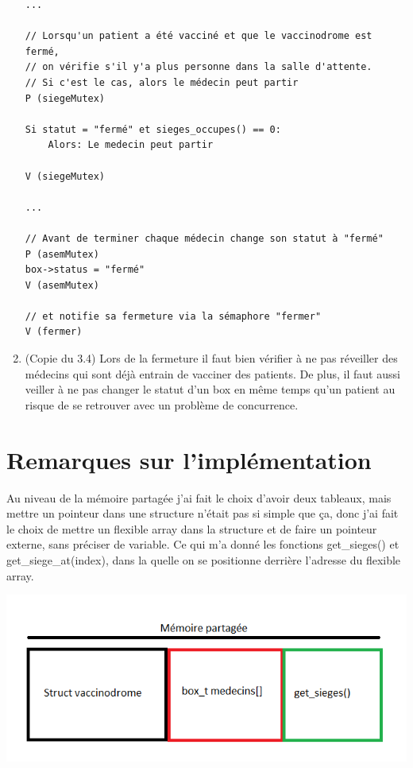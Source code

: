 \documentclass[a4paper]{article}
\begin{document}
\begin{enumerate}
\begin{verbatim}
...

// Lorsqu'un patient a été vacciné et que le vaccinodrome est fermé,
// on vérifie s'il y'a plus personne dans la salle d'attente.
// Si c'est le cas, alors le médecin peut partir
P (siegeMutex)

Si statut = "fermé" et sieges_occupes() == 0:
    Alors: Le medecin peut partir

V (siegeMutex)

...

// Avant de terminer chaque médecin change son statut à "fermé"
P (asemMutex)
box->status = "fermé"
V (asemMutex)

// et notifie sa fermeture via la sémaphore "fermer"
V (fermer)
    \end{verbatim}

    \item (Copie du 3.4) Lors de la fermeture il faut bien vérifier à ne pas réveiller des médecins qui sont déjà entrain de vacciner des patients. De plus, il faut aussi veiller à ne pas changer le statut d'un box en même temps qu'un patient au risque de se retrouver avec un problème de concurrence.
  \end{enumerate}
  \newpage

  \section{Remarques sur l'implémentation}

  Au niveau de la mémoire partagée j'ai fait le choix d'avoir deux tableaux, mais mettre un pointeur dans une structure n'était pas si simple que ça, donc j'ai fait le choix de mettre un flexible array dans la structure et de faire un pointeur externe, sans préciser de variable. Ce qui m'a donné les fonctions get\_sieges() et get\_siege\_at(index), dans la quelle on se positionne derrière l'adresse du flexible array.

  \includegraphics[scale=0.8]{mempartagee.png}
  \label{fig1}
\end{document}
